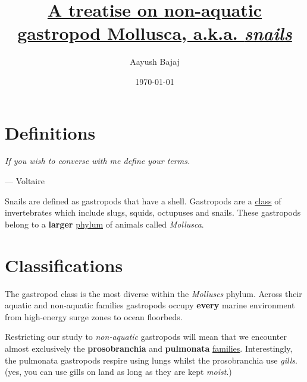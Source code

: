 \documentclass[twoside]{article}
\title{\underline{A treatise on non-aquatic gastropod Mollusca, a.k.a. \emph{snails}}}
\author{Aayush Bajaj}
\date{\today}
\begin{document}
\maketitle %
\thispagestyle{fancy}

\dotfill
\bigbreak

\section*{Definitions}

    \begin{flushright}
    \begin{minipage}{8cm}
        \begin{flushleft} \emph{If you wish to converse with me define your terms.} \end{flushleft}
        \begin{flushright}--- Voltaire\end{flushright}
    \end{minipage}
    \end{flushright}

    Snails are defined as gastropods that have a shell. Gastropods are a \underline{class} of invertebrates which include slugs, squids, octupuses and snails. These gastropods belong to a \textbf{larger} \underline{\gls{phylum}} of \gls{animal}s called \emph{Mollusca}.

\section*{Classifications}
    The gastropod class is the most diverse within the \emph{Molluscs} phylum. Across their aquatic and non-aquatic families gastropods occupy \textbf{every} marine environment from high-energy surge zones to ocean floorbeds.

    Restricting our study to \emph{non-aquatic} gastropods will mean that we encounter almost exclusively the \textbf{prosobranchia} and \textbf{pulmonata} \underline{families}. Interestingly, the pulmonata gastropods respire using lungs whilst the prosobranchia use \emph{gills}. (yes, you can use gills on land as long as they are kept \emph{moist}.)\\
\end{document}
